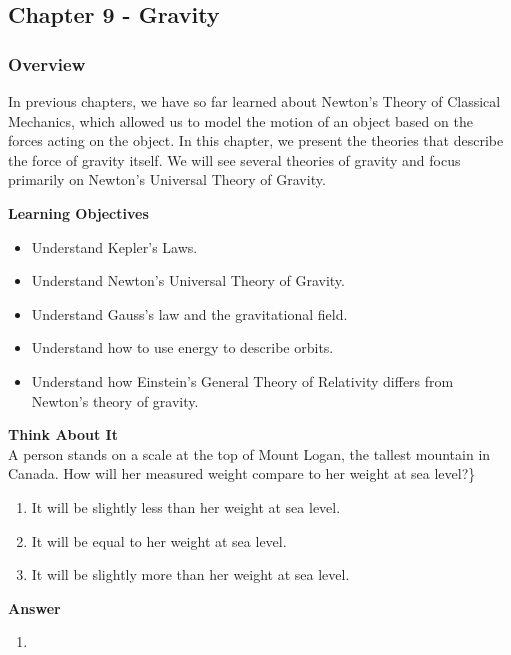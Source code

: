 \subsection{Chapter 9 - Gravity}

\subsubsection{Overview}\label{chapter:gravity}

In previous chapters, we have so far learned about Newton's Theory of Classical Mechanics, which allowed us to model the motion of an object based on the forces acting on the object. In this chapter, we present the theories that describe the force of gravity itself. We will see several theories of gravity and focus primarily on Newton's Universal Theory of Gravity.

\begin{framed}
\textbf{Learning Objectives}\\
\begin{itemize}
\item Understand Kepler's Laws.
\item Understand Newton's Universal Theory of Gravity.
\item Understand Gauss's law and the gravitational field.
\item Understand how to use energy to describe orbits.
\item Understand how Einstein's General Theory of Relativity differs from Newton's theory of gravity.
\end{itemize}
\end{framed}

\begin{framed}
\textbf{Think About It}\\
A person stands on a scale at the top of Mount Logan, the tallest mountain in Canada. How will her measured weight compare to her weight at sea level?\}

\begin{enumerate}
\item It will be slightly less than her weight at sea level.
\item It will be equal to her weight at sea level.
\item It will be slightly more than her weight at sea level.
\end{enumerate}

\begin{framed}
\textbf{Answer}\\
\begin{enumerate}
\item
\end{enumerate}
\end{framed}
\end{framed}

